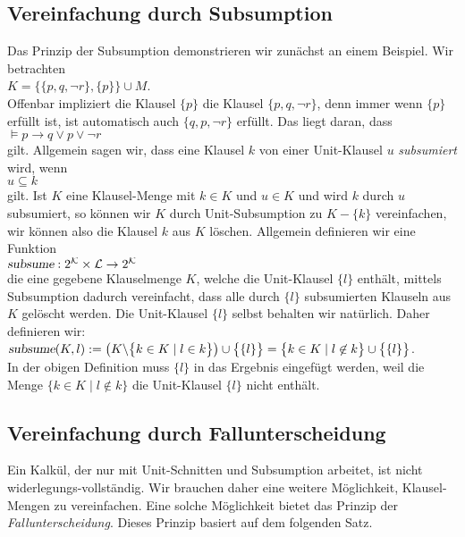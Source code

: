 \subsection{Vereinfachung durch Subsumption}
Das Prinzip der Subsumption demonstrieren wir zun\"{a}chst an einem Beispiel.
Wir betrachten \\[0.2cm]
\hspace*{1.3cm} $K = \bigl\{ \{p, q, \neg r\}, \{p\} \bigr\} \cup M$. \\[0.2cm]
Offenbar impliziert die Klausel $\{p\}$ die Klausel $\{p, q, \neg r\}$, denn immer wenn
$\{p\}$ erf\"{u}llt ist, ist automatisch auch $\{q, p, \neg r\}$ erf\"{u}llt.  Das liegt daran, dass 
\\[0.2cm]
\hspace*{1.3cm} $\models p \rightarrow q \vee p \vee \neg r$
\\[0.2cm]
gilt.  Allgemein sagen wir, dass eine Klausel $k$
 von einer Unit-Klausel $u$ \emph{\color{blue}subsumiert} wird, wenn
\\[0.2cm]
\hspace*{1.3cm} $u \subseteq k$ \\[0.2cm]
gilt.  Ist $K$ eine Klausel-Menge mit $k \in K$ und $u \in K$ und wird
$k$ durch $u$ subsumiert, so k\"{o}nnen wir $K$ durch Unit-Subsumption zu $K - \{k\}$
vereinfachen, wir k\"{o}nnen also die Klausel $k$ aus $K$ l\"{o}schen.  Allgemein definieren wir eine Funktion
\\[0.2cm]
\hspace*{1.3cm}
$\textsl{subsume}: 2^\mathcal{K} \times \mathcal{L} \rightarrow 2^\mathcal{K}$
\\[0.2cm]
die eine gegebene Klauselmenge $K$, welche die Unit-Klausel $\{l\}$ enth\"{a}lt, mittels Subsumption 
dadurch vereinfacht, dass alle durch $\{l\}$ subsumierten Klauseln aus $K$ gel\"{o}scht werden.
Die Unit-Klausel $\{l\}$ selbst behalten wir nat\"{u}rlich.  Daher definieren wir:
\\[0.2cm]
\hspace*{1.3cm}
$\textsl{subsume}(K, l) := 
\bigl(K \backslash \bigl\{ k \in K \mid l \in k \bigr\}\bigr) \cup \bigl\{\{l\}\bigr\} = 
\bigl\{ k \in K \mid l \not\in k \bigr\} \cup \bigl\{\{l\}\bigr\}$.
\\[0.2cm]
In der obigen Definition muss $\{l\}$ in das Ergebnis eingef\"{u}gt werden, weil die Menge
$\bigl\{ k \in K \mid l \not\in k \bigr\}$ die Unit-Klausel $\{l\}$ nicht enth\"{a}lt.


\subsection{Vereinfachung durch Fallunterscheidung}
Ein Kalk\"{u}l, der nur mit Unit-Schnitten und Subsumption arbeitet, ist nicht 
widerlegungs-vollst\"{a}ndig.  Wir brauchen 
daher eine weitere M\"{o}glichkeit, Klausel-Mengen zu vereinfachen.
Eine solche M\"{o}glichkeit bietet das Prinzip der
\emph{\color{blue}Fallunterscheidung}.  Dieses Prinzip basiert auf dem folgenden
Satz.

